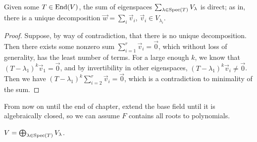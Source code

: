 \begin{lemma}\label{lem:eigenspace-direct-sum}
    Given some \(T \in \operatorname{End}(V)\),
    the sum of eigenspaces \(\sum_{\lambda\in\operatorname{Spec}(T)} V_\lambda\) is direct;
    as in, there is a unique decomposition \(\vec{w} = \sum_i \vec{v}_i\),
    \(\vec{v}_i \in V_{\lambda_i}\).
\end{lemma}
\begin{proof}
    Suppose, by way of contradiction,
    that there is no unique decomposition.
    Then there exists some nonzero sum \(\sum_{i=1}^r \vec{v}_i = \vec{0}\),
    which without loss of generality, has the least number of terms.
    For a large enough \(k\), we know that \({(T-\lambda_1)}^k\vec{v}_1 = \vec{0}\),
    and by invertibility in other eigenspaces, \({(T-\lambda_1)}^k\vec{v}_i \neq \vec{0}\).
    Then we have \({(T-\lambda_1)}^k \sum_{i=2}^r \vec{v}_i = \vec{0}\),
    which is a contradiction to minimality of the sum.
\end{proof}
\begin{remark}
    From now on until the end of chapter,
    extend the base field until it is algebraically closed,
    so we can assume \(F\) contains all roots to polynomials.
\end{remark}
\begin{theorem}
    \(V = \bigoplus_{\lambda\in\operatorname{Spec}(T)} V_{\lambda}\).
\end{theorem}
